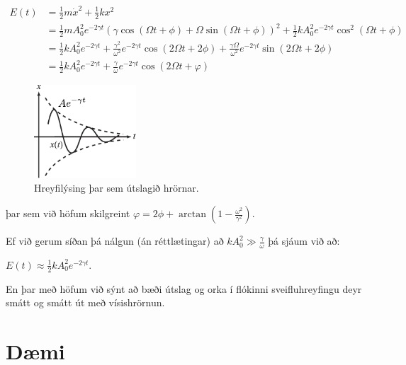 \begin{align*}
    E(t) &= \frac{1}{2}m\dot{x}^2 + \frac{1}{2}kx^2 \\ &= \frac{1}{2}m A_0^2 e^{-2\gamma t}\left( \gamma \cos(\Omega t + \phi) + \Omega \sin(\Omega t + \phi) \right)^2 + \frac{1}{2}kA_0^2 e^{-2\gamma t} \cos^2(\Omega t + \phi) \\
    &= \frac{1}{2}kA_0^2e^{-2\gamma t} + \frac{\gamma^2}{\omega^2}e^{-2\gamma t}\cos(2\Omega t + 2\phi) + \frac{\gamma \Omega}{\omega^2}e^{-2\gamma t}\sin(2\Omega t + 2\phi) \\
    &= \frac{1}{2}kA_0^2 e^{-2\gamma t} + \frac{\gamma}{\omega}e^{-2\gamma t} \cos(2\Omega t + \varphi)
\end{align*}
\begin{minipage}{\linewidth}

\begin{figure}
\vspace{-1cm}
\includegraphics[width = 1.5in]{images/orkan.pdf}
\caption{Hreyfilýsing þar sem útslagið hrörnar.}
\end{figure}
þar sem við höfum skilgreint $\varphi = 2\phi + \arctan(1-\frac{\omega^2}{\gamma^2})$.

Ef við gerum síðan þá nálgun (án réttlætingar) að $kA_0^2 \gg \frac{\gamma}{\omega}$ þá sjáum við að:
\begin{center} \hspace{-1.5cm}
\begin{tcbox}[nobeforeafter]{$ E(t) \approx \frac{1}{2}kA_0^2e^{-2\gamma t}.$}
\end{tcbox}
\end{center}
En þar með höfum við sýnt að bæði útslag og orka í flókinni sveifluhreyfingu deyr smátt og smátt út með vísishrörnun.
\end{minipage}


\newpage

\section{Dæmi}


